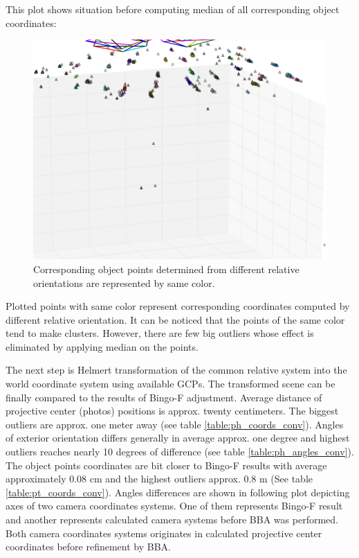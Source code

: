 \documentclass[a4paper,12pt]{article}
\begin{document}

This plot shows situation before computing median of all corresponding object coordinates:

\begin{center}
 \begin{figure}[!h]
    \includegraphics[scale=0.5]{figures/before_median.png}
    \caption{Corresponding object points determined from different relative orientations are represented by same color.}
    \label{fig:rel_or_points}
\end{figure}
\end{center}

Plotted points with same color represent corresponding coordinates computed by different relative orientation. It can be noticed that 
the points of the same color tend to make clusters. However, there are few big outliers whose effect is eliminated by applying
median on the points.

The next step is Helmert transformation of the common relative system into the world coordinate system using available GCPs.
The transformed scene can be finally compared to the results of Bingo-F adjustment.
Average distance of projective center (photos) positions is approx. twenty centimeters. 
The  biggest  outliers are approx. one meter away  
(see table \ref{table:ph_coords_conv}). Angles of exterior orientation differs  generally in average approx. one degree and 
highest outliers reaches nearly 10 degrees of difference (see table \ref{table:ph_angles_conv}). 
The object points coordinates 
are bit closer to Bingo-F results with average approximately 0.08 cm and the highest outliers approx. 0.8 m (See table \ref{table:pt_coords_conv}). 
Angles differences are shown in following plot depicting axes of two camera coordinates systems. One of them represents 
Bingo-F result and another represents
 calculated camera systems before BBA was performed. Both camera coordinates systems originates in calculated projective center coordinates
  before refinement by BBA.
    
\end{document}
